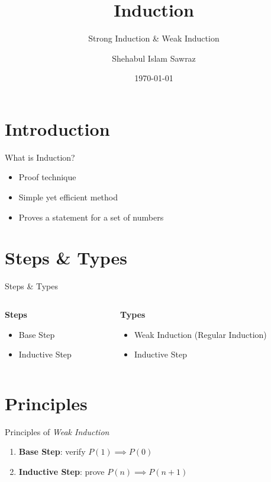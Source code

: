 \documentclass{beamer}
\title{Induction}
\subtitle{Strong Induction \& Weak Induction}
\author{Shehabul Islam Sawraz}
\institute[CSE, BUET]{Computer Science \& Engineering, Bangladesh University of Engineering \& Technology}
\date{\today}
\begin{document}
\begin{frame}{}
    \titlepage
\end{frame}

\section{Introduction}
\begin{frame}{What is Induction?}
    \begin{itemize}
        \item Proof technique \pause
        \item Simple yet efficient method \pause
        \item Proves a statement for a set of numbers
    \end{itemize}
\end{frame}

\section{Steps \& Types}

\begin{frame}{Steps \& Types}
\begin{columns}
    \begin{column}{0.3\textwidth}
    \textbf{Steps}
    \begin{itemize}
        \item Base Step
        \item Inductive Step
    \end{itemize}
    \end{column}
    \begin{column}{0.4\textwidth}
    \pause
    \textbf{Types}
    \begin{itemize}
        \item Weak Induction (Regular Induction)
        \item Inductive Step
    \end{itemize}
    \end{column}
\end{columns}
\end{frame}

\section{Principles}
\begin{frame}{Principles of \textit{Weak Induction}}
    \begin{enumerate}
        \item \textbf{Base Step}: verify $P(1) \implies P(0)$ \pause
        \item \textbf{Inductive Step}: prove $P(n) \implies P(n+1)$
    \end{enumerate}
\end{frame}
\end{document}
